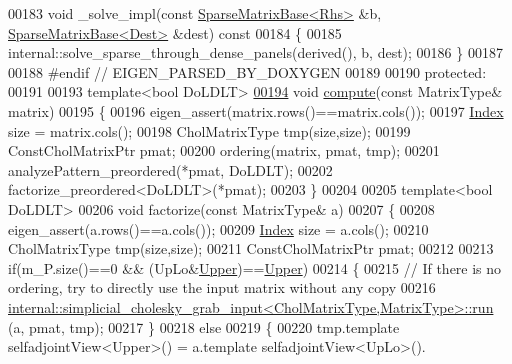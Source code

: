 \begin{DoxyCode}
00183     \textcolor{keywordtype}{void} \_solve\_impl(\textcolor{keyword}{const} \hyperlink{group___sparse_core___module_class_eigen_1_1_sparse_matrix_base}{SparseMatrixBase<Rhs>} &b, 
      \hyperlink{group___sparse_core___module_class_eigen_1_1_sparse_matrix_base}{SparseMatrixBase<Dest>} &dest)\textcolor{keyword}{ const}
00184 \textcolor{keyword}{    }\{
00185       internal::solve\_sparse\_through\_dense\_panels(derived(), b, dest);
00186     \}
00187 
00188 \textcolor{preprocessor}{#endif // EIGEN\_PARSED\_BY\_DOXYGEN}
00189 
00190   \textcolor{keyword}{protected}:
00191     
00193     \textcolor{keyword}{template}<\textcolor{keywordtype}{bool} DoLDLT>
\hyperlink{group___sparse_cholesky___module_a9a741744dda2261cae26cddf96a35bf0}{00194}     \textcolor{keywordtype}{void} \hyperlink{group___sparse_cholesky___module_a9a741744dda2261cae26cddf96a35bf0}{compute}(\textcolor{keyword}{const} MatrixType& matrix)
00195     \{
00196       eigen\_assert(matrix.rows()==matrix.cols());
00197       \hyperlink{namespace_eigen_a62e77e0933482dafde8fe197d9a2cfde}{Index} size = matrix.cols();
00198       CholMatrixType tmp(size,size);
00199       ConstCholMatrixPtr pmat;
00200       ordering(matrix, pmat, tmp);
00201       analyzePattern\_preordered(*pmat, DoLDLT);
00202       factorize\_preordered<DoLDLT>(*pmat);
00203     \}
00204     
00205     \textcolor{keyword}{template}<\textcolor{keywordtype}{bool} DoLDLT>
00206     \textcolor{keywordtype}{void} factorize(\textcolor{keyword}{const} MatrixType& a)
00207     \{
00208       eigen\_assert(a.rows()==a.cols());
00209       \hyperlink{namespace_eigen_a62e77e0933482dafde8fe197d9a2cfde}{Index} size = a.cols();
00210       CholMatrixType tmp(size,size);
00211       ConstCholMatrixPtr pmat;
00212       
00213       \textcolor{keywordflow}{if}(m\_P.size()==0 && (UpLo&\hyperlink{group__enums_gga39e3366ff5554d731e7dc8bb642f83cda6bcb58be3b8b8ec84859ce0c5ac0aaec}{Upper})==\hyperlink{group__enums_gga39e3366ff5554d731e7dc8bb642f83cda6bcb58be3b8b8ec84859ce0c5ac0aaec}{Upper})
00214       \{
00215         \textcolor{comment}{// If there is no ordering, try to directly use the input matrix without any copy}
00216         \hyperlink{struct_eigen_1_1internal_1_1simplicial__cholesky__grab__input}{internal::simplicial\_cholesky\_grab\_input<CholMatrixType,MatrixType>::run}
      (a, pmat, tmp);
00217       \}
00218       \textcolor{keywordflow}{else}
00219       \{
00220         tmp.template selfadjointView<Upper>() = a.template selfadjointView<UpLo>().

\end{DoxyCode}

